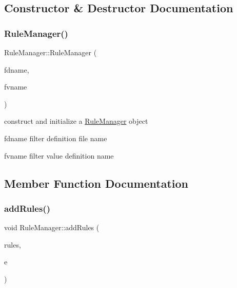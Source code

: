 \subsection{Constructor \& Destructor Documentation}
\mbox{\label{classRuleManager_a31bcd41f979a78dcdeb9dcfc2460aa15}} 
\subsubsection{\texorpdfstring{Rule\+Manager()}{RuleManager()}}
{\footnotesize\ttfamily Rule\+Manager\+::\+Rule\+Manager (\begin{DoxyParamCaption}\item[{string}]{fdname,  }\item[{string}]{fvname }\end{DoxyParamCaption})}



construct and initialize a \hyperlink{classRuleManager}{Rule\+Manager} object 

\begin{DoxyItemize}
\item {\ttfamily fdname} filter definition file name \item {\ttfamily fvname} filter value definition name \end{DoxyItemize}


\subsection{Member Function Documentation}
\mbox{\label{classRuleManager_ae1d3a7b7e4ccf47a992e8239d3f643a4}} 
\subsubsection{\texorpdfstring{add\+Rules()}{addRules()}}
{\footnotesize\ttfamily void Rule\+Manager\+::add\+Rules (\begin{DoxyParamCaption}\item[{\hyperlink{RuleFileParser_8h_a7d5bb94bb17a8a1d92db2a89a0cc96d1}{rule\+D\+B\+\_\+t} $\ast$}]{rules,  }\item[{\hyperlink{classEventScheduler}{Event\+Scheduler} $\ast$}]{e }\end{DoxyParamCaption})}



